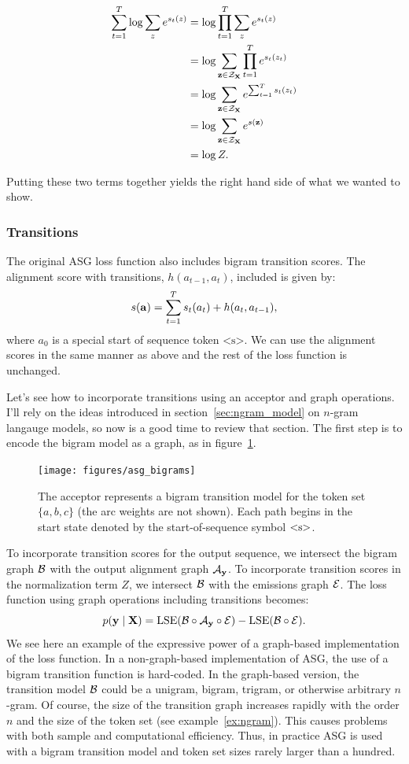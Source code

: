 \begin{align*}
\sum_{t=1}^T \log \sum_z e^{s_t(z)} &= \log \prod_{t=1}^T \sum_z e^{s_t(z)} \\
&= \log \sum_{{\bf z} \in \mathcal{\mathcal{Z}_{\bf X}}} \prod_{t=1}^T e^{s_t(z_t)} \\
&= \log \sum_{{\bf z} \in \mathcal{\mathcal{Z}_{\bf X}}} e^{\sum_{t=1}^T s_t(z_t)} \\
&= \log \sum_{{\bf z} \in \mathcal{\mathcal{Z}_{\bf X}}} e^{s({\bf z})} \\
&= \log Z.
\end{align*}

Putting these two terms together yields the right hand side of what we wanted to show.


\subsubsection{Transitions}

The original ASG loss function also includes bigram transition scores. The
alignment score with transitions, $h(a_{t-1}, a_t)$, included is given by:
$$
s({\bf a}) = \sum_{t=1}^T s_t(a_t) + h(a_t, a_{t-1}),
$$
where $a_0$ is a special start of sequence token $\textrm{<s>}$. We can use the
alignment scores in the same manner as above and the rest of the loss function
is unchanged.

Let's see how to incorporate transitions using an acceptor and graph
operations. I'll rely on the ideas introduced in section~\ref{sec:ngram_model}
on $n$-gram langauge models, so now is a good time to review that section. The
first step is to encode the bigram model as a graph, as in
figure~\ref{fig:asg_bigrams}.

\begin{figure}
    \centering
    \texttt{[image: figures/asg\_bigrams]}
    \caption{The acceptor represents a bigram transition model for the token
    set $\{a, b, c\}$ (the arc weights are not shown). Each path begins in the
    start state denoted by the start-of-sequence symbol $\textrm{<s>}$.}
    \label{fig:asg_bigrams}
\end{figure}

To incorporate transition scores for the output sequence, we intersect the
bigram graph $\mathcal{B}$ with the output alignment graph $\mathcal{A}_{\bf y}$. To incorporate
transition scores in the normalization term $Z$, we intersect $\mathcal{B}$ with the
emissions graph $\mathcal{E}$. The loss function using graph operations including
transitions becomes:
$$
p({\bf y} \mid {\bf X}) = \operatorname*{\textrm{LSE}}(\mathcal{B} \circ \mathcal{A}_{\bf y} \circ \mathcal{E}) - \operatorname*{\textrm{LSE}}(\mathcal{B} \circ \mathcal{E}).
$$
We see here an example of the expressive power of a graph-based implementation
of the loss function. In a non-graph-based implementation of ASG, the use of a
bigram transition function is hard-coded. In the graph-based version, the
transition model $\mathcal{B}$ could be a unigram, bigram, trigram, or otherwise
arbitrary $n$-gram. Of course, the size of the transition graph increases
rapidly with the order $n$ and the size of the token set (see
example~\ref{ex:ngram}). This causes problems with both sample and
computational efficiency. Thus, in practice ASG is used with a bigram
transition model and token set sizes rarely larger than a hundred.

